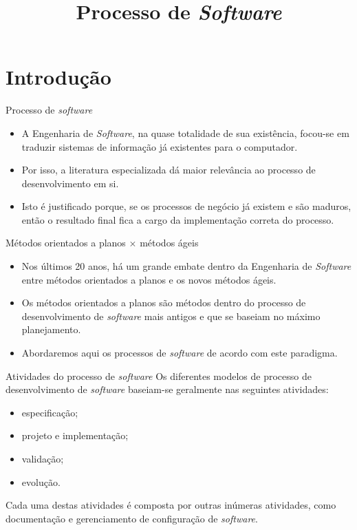 \documentclass[11pt]{beamer}
\title{Processo de \textit{Software}}
\author{}
\date{}
\begin{document}
   \begin{frame}[plain]
        \titlepage
   \end{frame}

   \section*{Introdução}

   \begin{frame}{Processo de \textit{software}}
      \begin{itemize}
         \item A Engenharia de \textit{Software}, na quase totalidade de sua existência, focou-se em traduzir sistemas de informação já existentes para o computador.
         \item Por isso, a literatura especializada dá maior relevância ao processo de desenvolvimento em si.
         \item Isto é justificado porque, se os processos de negócio já existem e são maduros, então o resultado final fica a cargo da implementação correta do processo.
      \end{itemize}
   \end{frame}

   \begin{frame}{Métodos orientados a planos $\times$ métodos ágeis}
      \begin{itemize}
         \item Nos últimos 20 anos, há um grande embate dentro da Engenharia de \textit{Software} entre métodos orientados a planos e os novos métodos ágeis.
         \item Os métodos orientados a planos são métodos dentro do processo de desenvolvimento de \textit{software} mais antigos e que se baseiam no máximo planejamento.
         \item Abordaremos aqui os processos de \textit{software} de acordo com este paradigma.
      \end{itemize}
   \end{frame}

   \begin{frame}{Atividades do processo de \textit{software}}
      Os diferentes modelos de processo de desenvolvimento de \textit{software} baseiam-se geralmente nas seguintes atividades:
      \begin{itemize}
         \item especificação;
         \item projeto e implementação;
         \item validação;
         \item evolução.
      \end{itemize}
      Cada uma destas atividades é composta por outras inúmeras atividades, como documentação e gerenciamento de configuração de \textit{software}.
   \end{frame}
\end{document}
